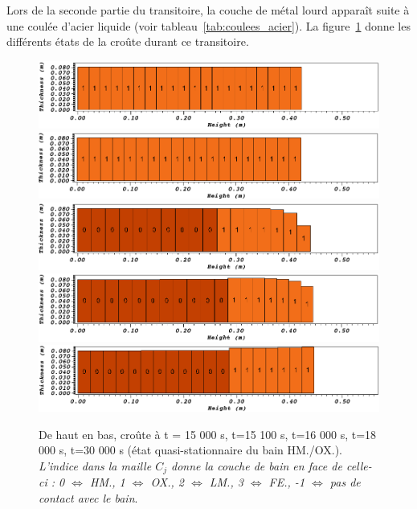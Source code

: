 Lors de la seconde partie du transitoire, la couche de métal lourd apparaît suite à une coulée d'acier liquide (voir tableau~\ref{tab:coulees_acier}). La figure~\ref{fig:croutes_2} donne les différents états de la croûte durant ce transitoire.
\begin{figure}
\centering
\includegraphics[width=\textwidth, keepaspectratio=true]{Figures/croute_15000.png}\\
\includegraphics[width=\textwidth, keepaspectratio=true]{Figures/croute_15100.png}\\
\includegraphics[width=\textwidth, keepaspectratio=true]{Figures/croute_16000.png}\\
\includegraphics[width=\textwidth, keepaspectratio=true]{Figures/croute_18000.png}\\
\includegraphics[width=\textwidth, keepaspectratio=true]{Figures/croute_30000.png}\\
\caption{De haut en bas, croûte à t = 15 000 s, t=15 100 s, t=16 000 s, t=18 000 s, t=30 000 s (état quasi-stationnaire du bain HM./OX.). \textit{L'indice dans la maille $C_j$ donne la couche de bain en face de celle-ci : 0 $\Leftrightarrow$ HM., 1 $\Leftrightarrow$ OX., 2 $\Leftrightarrow$ LM., 3 $\Leftrightarrow$ FE., -1 $\Leftrightarrow$ pas de contact avec le bain}.}
\label{fig:croutes_2}
\end{figure}
